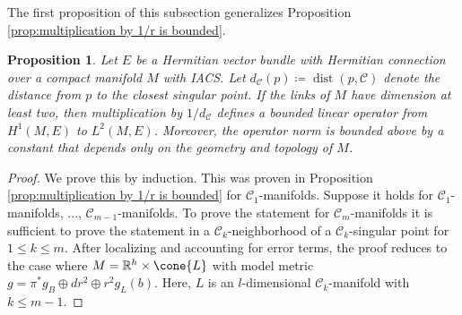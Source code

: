 \documentclass[12pt, reqno]{amsart}
\theoremstyle{plain} %
\newtheorem{proposition}[theorem]{Proposition}
\theoremstyle{definition}
\theoremstyle{remark}
\numberwithin{equation}{section}
\newcommand{\cat}[1]{\mathcal{#1}}
\newcommand{\field}[1]{\mathbb{#1}}
\newcommand{\R}{\field{R}}
\newcommand{\hdim}{h} %
\newcommand{\ldim}{l} %
\DeclareMathOperator{\dist}{dist}
\begin{document}
The first proposition of this subsection generalizes Proposition \ref{prop:multiplication by 1/r is bounded}.
\begin{proposition}\label{prop:multiplication by 1/r is bounded - iacs manifolds}
    Let \(E\) be a Hermitian vector bundle with Hermitian connection over a compact manifold \(M\) with IACS.
    Let \(d_\cat{C}(p) \coloneqq \dist(p, \cat{C})\) denote the distance from \(p\) to the closest singular point.
    If the links of \(M\) have dimension at least two, then multiplication by \(1/d_\cat{C}\) defines a bounded linear operator from \(H^1(M, E)\) to \(L^2(M, E) \).
    Moreover, the operator norm is bounded above by a constant that depends only on the geometry and topology of \(M\).
\end{proposition}
\begin{proof}
    We prove this by induction.
    This was proven in Proposition \ref{prop:multiplication by 1/r is bounded} for \(\cat{C}_1\)-manifolds.
    Suppose it holds for \(\cat{C}_1\)-manifolds, ..., \(\cat{C}_{m-1}\)-manifolds.
    To prove the statement for \(\cat{C}_m\)-manifolds it is sufficient to prove the statement in a \(\cat{C}_k\)-neighborhood of a \(\cat{C}_k\)-singular point for \(1 \leq k \leq m\).
    After localizing and accounting for error terms, the proof reduces to the case where \(M = \R^\hdim \times \cone{L}\) with model metric \(g = \pi^*g_B \oplus dr^2 \oplus r^2 g_L(b)\).
    Here, \(L\) is an \(\ldim\)-dimensional \(\cat{C}_k\)-manifold with \(k \leq m-1\).
    

\end{proof}
\end{document}
